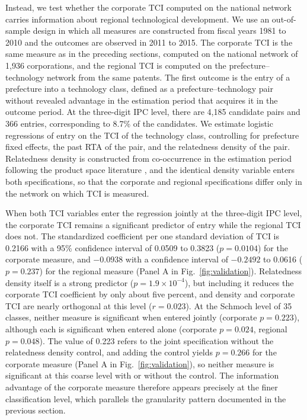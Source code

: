 \documentclass[lineno,pdflatex,sn-mathphys-num]{sn-jnl}%
\theoremstyle{thmstyleone}%
\theoremstyle{thmstyletwo}%
\theoremstyle{thmstylethree}%
\begin{document}
Instead, we test whether the corporate TCI computed on the national network carries information about regional technological development.
We use an out-of-sample design in which all measures are constructed from fiscal years 1981 to 2010 and the outcomes are observed in 2011 to 2015.
The corporate TCI is the same measure as in the preceding sections, computed on the national network of 1,936 corporations, and the regional TCI is computed on the prefecture--technology network from the same patents.
The first outcome is the entry of a prefecture into a technology class, defined as a prefecture--technology pair without revealed advantage in the estimation period that acquires it in the outcome period.
At the three-digit IPC level, there are 4,185 candidate pairs and 366 entries, corresponding to 8.7\% of the candidates.
We estimate logistic regressions of entry on the TCI of the technology class, controlling for prefecture fixed effects, the past RTA of the pair, and the relatedness density of the pair.
Relatedness density is constructed from co-occurrence in the estimation period following the product space literature \cite{hidalgo2007product}, and the identical density variable enters both specifications, so that the corporate and regional specifications differ only in the network on which TCI is measured.

When both TCI variables enter the regression jointly at the three-digit IPC level, the corporate TCI remains a significant predictor of entry while the regional TCI does not.
The standardized coefficient per one standard deviation of TCI is 0.2166 with a 95\% confidence interval of 0.0509 to 0.3823 ($p = 0.0104$) for the corporate measure, and $-0.0938$ with a confidence interval of $-0.2492$ to 0.0616 ($p = 0.237$) for the regional measure (Panel A in Fig.~\ref{fig:validation}).
Relatedness density itself is a strong predictor ($p = 1.9\times10^{-4}$), but including it reduces the corporate TCI coefficient by only about five percent, and density and corporate TCI are nearly orthogonal at this level ($r = 0.023$).
At the Schmoch level of 35 classes, neither measure is significant when entered jointly (corporate $p = 0.223$), although each is significant when entered alone (corporate $p = 0.024$, regional $p = 0.048$).
The value of 0.223 refers to the joint specification without the relatedness density control, and adding the control yields $p = 0.266$ for the corporate measure (Panel A in Fig.~\ref{fig:validation}), so neither measure is significant at this coarse level with or without the control.
The information advantage of the corporate measure therefore appears precisely at the finer classification level, which parallels the granularity pattern documented in the previous section.
\end{document}
